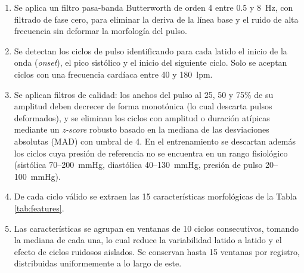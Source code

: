 \documentclass[11pt,a4paper]{article}
\begin{document}
\begin{enumerate}
    \item Se aplica un filtro pasa-banda Butterworth de orden 4 entre 0.5 y 8~Hz, con filtrado de fase cero, para eliminar la deriva de la línea base y el ruido de alta frecuencia sin deformar la morfología del pulso.
    \item Se detectan los ciclos de pulso identificando para cada latido el inicio de la onda (\textit{onset}), el pico sistólico y el inicio del siguiente ciclo. Solo se aceptan ciclos con una frecuencia cardíaca entre 40 y 180~lpm.
    \item Se aplican filtros de calidad: los anchos del pulso al 25, 50 y 75\% de su amplitud deben decrecer de forma monotónica (lo cual descarta pulsos deformados), y se eliminan los ciclos con amplitud o duración atípicas mediante un \textit{z-score} robusto basado en la mediana de las desviaciones absolutas (MAD) con umbral de 4. En el entrenamiento se descartan además los ciclos cuya presión de referencia no se encuentra en un rango fisiológico (sistólica 70--200~mmHg, diastólica 40--130~mmHg, presión de pulso 20--100~mmHg).
    \item De cada ciclo válido se extraen las 15 características morfológicas de la Tabla \ref{tab:features}.
    \item Las características se agrupan en ventanas de 10 ciclos consecutivos, tomando la mediana de cada una, lo cual reduce la variabilidad latido a latido y el efecto de ciclos ruidosos aislados. Se conservan hasta 15 ventanas por registro, distribuidas uniformemente a lo largo de este.
\end{enumerate}
\end{document}
